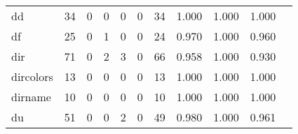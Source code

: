 \begin{longtable}{lp{1.20cm}p{1.20cm}p{1.20cm}p{1.20cm}p{1.20cm}p{1.20cm}p{1.20cm}p{1.20cm}p{1.20cm}p{1.20cm}}
dd        &                                    34 &                                                  0 &                                                  0 &                                                  0 &                                                  0 &                                                 34 &                                         1.000 &                                              1.000 &                                              1.000 \\
df        &                                    25 &                                                  0 &                                                  1 &                                                  0 &                                                  0 &                                                 24 &                                         0.970 &                                              1.000 &                                              0.960 \\
dir       &                                    71 &                                                  0 &                                                  2 &                                                  3 &                                                  0 &                                                 66 &                                         0.958 &                                              1.000 &                                              0.930 \\
dircolors &                                    13 &                                                  0 &                                                  0 &                                                  0 &                                                  0 &                                                 13 &                                         1.000 &                                              1.000 &                                              1.000 \\
dirname   &                                    10 &                                                  0 &                                                  0 &                                                  0 &                                                  0 &                                                 10 &                                         1.000 &                                              1.000 &                                              1.000 \\
du        &                                    51 &                                                  0 &                                                  0 &                                                  2 &                                                  0 &                                                 49 &                                         0.980 &                                              1.000 &                                              0.961 \\

\end{longtable}
